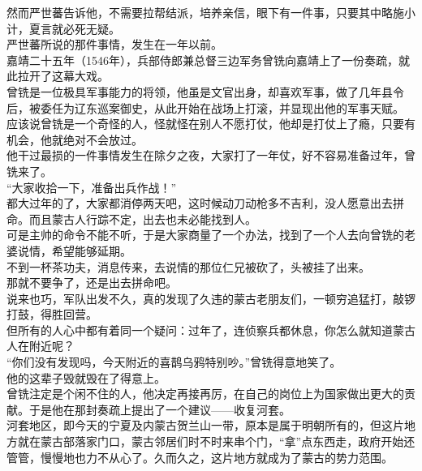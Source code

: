 \begin{multicols}{\theparacolNo}
然而严世蕃告诉他，不需要拉帮结派，培养亲信，眼下有一件事，只要其中略施小计，夏言就必死无疑。\\

严世蕃所说的那件事情，发生在一年以前。\\

嘉靖二十五年（1546年），兵部侍郎兼总督三边军务曾铣向嘉靖上了一份奏疏，就此拉开了这幕大戏。\\

曾铣是一位极具军事能力的将领，他虽是文官出身，却喜欢军事，做了几年县令后，被委任为辽东巡案御史，从此开始在战场上打滚，并显现出他的军事天赋。\\

应该说曾铣是一个奇怪的人，怪就怪在别人不愿打仗，他却是打仗上了瘾，只要有机会，他就绝对不会放过。\\

他干过最损的一件事情发生在除夕之夜，大家打了一年仗，好不容易准备过年，曾铣来了。\\

“大家收拾一下，准备出兵作战！”\\

都大过年的了，大家都消停两天吧，这时候动刀动枪多不吉利，没人愿意出去拼命。而且蒙古人行踪不定，出去也未必能找到人。\\

可是主帅的命令不能不听，于是大家商量了一个办法，找到了一个人去向曾铣的老婆说情，希望能够延期。\\

不到一杯茶功夫，消息传来，去说情的那位仁兄被砍了，头被挂了出来。\\

那就不要争了，还是出去拼命吧。\\

说来也巧，军队出发不久，真的发现了久违的蒙古老朋友们，一顿穷追猛打，敲锣打鼓，得胜回营。\\

但所有的人心中都有着同一个疑问：过年了，连侦察兵都休息，你怎么就知道蒙古人在附近呢？\\

“你们没有发现吗，今天附近的喜鹊乌鸦特别吵。”曾铣得意地笑了。\\

他的这辈子毁就毁在了得意上。\\

曾铣注定是个闲不住的人，他决定再接再厉，在自己的岗位上为国家做出更大的贡献。于是他在那封奏疏上提出了一个建议——收复河套。\\

河套地区，即今天的宁夏及内蒙古贺兰山一带，原本是属于明朝所有的，但这片地方就在蒙古部落家门口，蒙古邻居们时不时来串个门，“拿”点东西走，政府开始还管管，慢慢地也力不从心了。久而久之，这片地方就成为了蒙古的势力范围。\\


\end{multicols}
